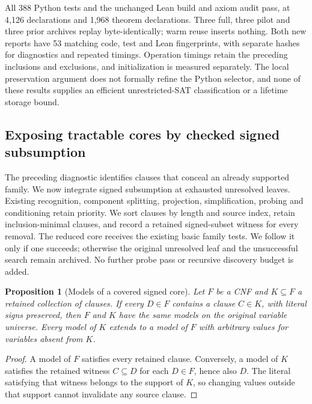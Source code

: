 \documentclass[11pt,a4paper]{article}
\numberwithin{equation}{section}
\theoremstyle{plain}
\newtheorem{proposition}[lemma]{Proposition}
\theoremstyle{definition}
\theoremstyle{remark}
\begin{document}
All 388 Python tests and the unchanged Lean build and axiom audit pass, at 4,126 declarations and 1,968 theorem declarations. Three full, three pilot and three prior archives replay byte-identically; warm reuse inserts nothing. Both new reports have 53 matching code, test and Lean fingerprints, with separate hashes for diagnostics and repeated timings. Operation timings retain the preceding inclusions and exclusions, and initialization is measured separately. The local preservation argument does not formally refine the Python selector, and none of these results supplies an efficient unrestricted-SAT classification or a lifetime storage bound.

\subsection{Exposing tractable cores by checked signed subsumption}
\label{sec:signed-subsumption}

The preceding diagnostic identifies clauses that conceal an already supported family. We now integrate signed subsumption at exhausted unresolved leaves. Existing recognition, component splitting, projection, simplification, probing and conditioning retain priority. We sort clauses by length and source index, retain inclusion-minimal clauses, and record a retained signed-subset witness for every removal. The reduced core receives the existing basic family tests. We follow it only if one succeeds; otherwise the original unresolved leaf and the unsuccessful search remain archived. No further probe pass or recursive discovery budget is added.

\begin{proposition}[Models of a covered signed core]
\label{prop:signed-core-models}
Let $F$ be a CNF and $K\subseteq F$ a retained collection of clauses. If every $D\in F$ contains a clause $C\in K$, with literal signs preserved, then $F$ and $K$ have the same models on the original variable universe. Every model of $K$ extends to a model of $F$ with arbitrary values for variables absent from $K$.
\end{proposition}
\begin{proof}
A model of $F$ satisfies every retained clause. Conversely, a model of $K$ satisfies the retained witness $C\subseteq D$ for each $D\in F$, hence also $D$. The literal satisfying that witness belongs to the support of $K$, so changing values outside that support cannot invalidate any source clause.
\end{proof}
\end{document}
